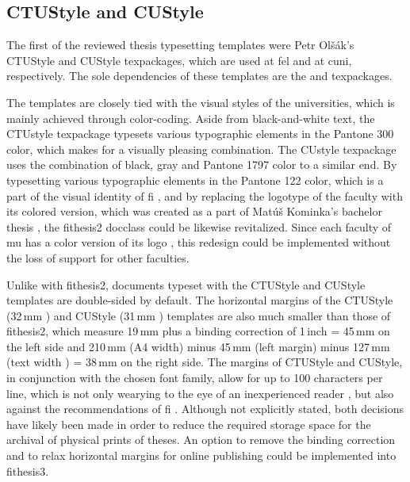       \subsection{CTUStyle and CUStyle}
      The first of the reviewed thesis typesetting templates were Petr Olšák's CTUStyle \cite{ctustyle} and CUStyle \cite{custyle} \glspl{texpackage}, which are used at \gls{fel} and at \gls{cuni}, respectively. The sole dependencies of these templates are the  and  \glspl{texpackage}.

      The templates are closely tied with the visual styles of the universities, which is mainly achieved through color-coding. Aside from black-and-white text, the CTUstyle \gls{texpackage} typesets various typographic elements in the  Pantone 300 color, which makes for a visually pleasing combination. The CUstyle \gls{texpackage} uses the combination of black, gray and  Pantone 1797 color to a similar end. By typesetting various typographic elements in the  Pantone 122 color, which is a part of the visual identity of \gls{fi} \cite{filogo}, and by replacing the logotype of the faculty with its colored version, which was created as a part of Matúš Kominka's bachelor thesis \cite{Kominka08}, the fithesis2 \gls{docclass} could be likewise revitalized.  Since each faculty of \gls{mu} has a color version of its logo \cite{muvis}, this redesign could be implemented without the loss of support for other faculties. 

      Unlike with fithesis2, documents typeset with the CTUStyle and CUStyle templates are double-sided by default. The horizontal margins of the CTUStyle (32\,mm \cite[line 249]{ctustyleCode}) and CUStyle (31\,mm \cite[line 229]{custyleCode}) templates are also much smaller than those of fithesis2, which measure 19\,mm \cite[lines 968--976]{fithesis2Code} plus a binding correction of 1\,inch \cite{latexlayout} = 45\,mm on the left side and 210\,mm (A4 width) minus 45\,mm (left margin) minus 127\,mm (text width \cite[lines~989, 1017, 1045]{fithesis2Code}) = 38\,mm on the right side. The margins of CTUStyle and CUStyle, in conjunction with the chosen font family, allow for up to 100 characters per line, which is not only wearying to the eye of an inexperienced reader \cite[section 2.1.2]{eletypostyle}, but also against the recommendations of \gls{fi} \cite[section 3.2.3]{bpdpfi}. Although not explicitly stated, both decisions have likely been made in order to reduce the required storage space for the archival of physical prints of theses. An option to remove the binding correction and to relax horizontal margins for online publishing could be implemented into fithesis3. 

